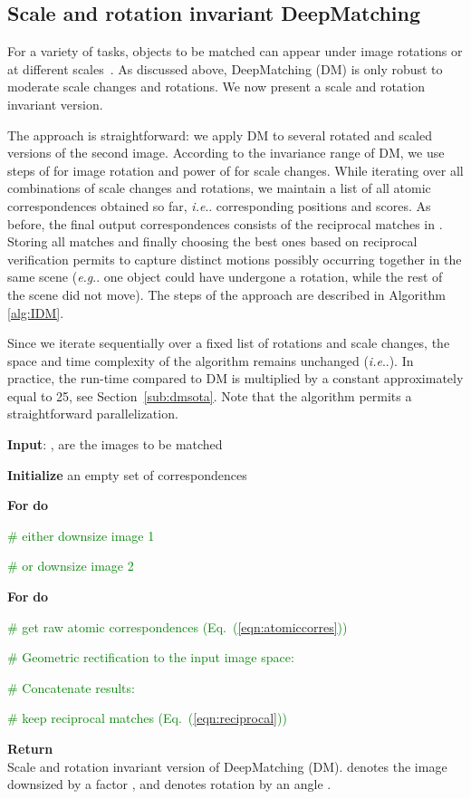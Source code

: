 \documentclass[twocolumn,natbib]{svjour3}
\makeatletter
\DeclareRobustCommand\onedot{\futurelet\@let@token\@onedot}
\def\@onedot{\ifx\@let@token.\else.\null\fi\xspace}
\def\eg{\emph{e.g}\onedot} \def\Eg{\emph{E.g}\onedot}
\def\ie{\emph{i.e}\onedot} \def\Ie{\emph{I.e}\onedot}
\def\eq{Eq.~}
\newcommand{\refp}[1]{(\ref{#1})}
\makeatother
\begin{document}
\subsection{Scale and rotation invariant DeepMatching}
\label{sub:scalerot}

For a variety of tasks, objects to be matched can appear under image
rotations or at different scales~\citep{Lowe2004,Mikolajczyk2005,Szeliski2010,HaCohen2011}.
As discussed above, DeepMatching (DM) is only robust to moderate
scale changes and rotations. We now present a scale and rotation invariant version.

The approach is straightforward: 
we apply DM to several rotated and scaled versions of the second
image. According to the invariance range of DM, we use steps of
 for image rotation and power of  for scale
changes. While iterating over all combinations of scale changes and
rotations, we maintain a list 
 of
all atomic correspondences obtained so far, \ie corresponding positions and scores.
As before, the final output correspondences consists of the reciprocal
matches in . 
Storing all matches and finally choosing the best ones based on reciprocal verification
permits to capture distinct motions
possibly occurring together in the same scene (\eg one object could have undergone a rotation, while the
rest of the scene did not move). 
The steps of the approach are described in Algorithm \ref{alg:IDM}.

Since we iterate sequentially over a fixed list of rotations and scale changes,
the space and time complexity of the algorithm remains unchanged (\ie ).
In practice, the run-time compared to DM is multiplied by a constant approximately equal to 25, see Section~\ref{sub:dmsota}. 
Note that the algorithm permits a straightforward parallelization. 

\begin{algorithm}
\textbf{Input}: ,  are the images to be matched

\textbf{Initialize} an empty set  of correspondences 

\textbf{For}  \textbf{do}

 
\textcolor{green}{\# either downsize image 1}

 
\textcolor{green}{\# or downsize image 2}

\textbf{For }
\textbf{do}

\textcolor{green}{\# get raw atomic correspondences (\eq\refp{eqn:atomiccorres})}



\textcolor{green}{\# Geometric rectification to the input image space:}



\textcolor{green}{\# Concatenate results:}



 \textcolor{green}{\# keep reciprocal
matches (\eq\refp{eqn:reciprocal})}

\textbf{Return} \\

\caption{Scale and rotation invariant version of DeepMatching (DM). 
 denotes the image  downsized by a factor , 
and  denotes rotation by an angle .}


\label{alg:IDM} 
\end{algorithm}
\end{document}
